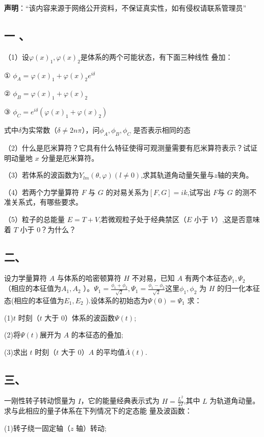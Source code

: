 
\textbf{声明}：“该内容来源于网络公开资料，不保证真实性，如有侵权请联系管理员”

\subsection{一 、}

（1）设$\varphi(x)_1, \varphi(x)_2$是体系的两个可能状态，有下面三种线性
叠加：

① $\phi_A = \varphi(x)_1 + \varphi(x)_2  e^{i\delta}$ 

② $\phi_B= \varphi(x)_1 + \varphi(x)_2 $

③ $\phi_C =e^{i\delta} (\varphi(x)_1 + \varphi(x)_2)$

式中$\delta$为实常数（$\delta \ne 2n\pi$），问$\phi_A ,\phi_B , \phi_C$ 是否表示相同的态

（2）什么是厄米算符？它具有什么特征使得可观测量需要有厄米算符表示？试证明动量地 $x$ 分量是厄米算符。

（3）若体系的波函数为$Y_{lm} (\theta, \varphi)(l\ne 0)$,求其轨道角动量矢量与$z$轴的夹角。

（4）若两个力学量算符 $F$ 与 $G$ 的对易关系为$[F,G]=ik$,试写出 $F$与 $G$ 的测不准关系式，有哪些要求。

（5）粒子的总能量 $E=T+V$,若微观粒子处于经典禁区（$E$ 小于 $V$）,这是否意味着 $T$ 小于 0？为什么？
\subsection{二、}
设力学量算符 $A$ 与体系的哈密顿算符 $H$ 不对易，已知 $A$ 有两个本征态$\Psi_1,\Psi_2 $ （相应的本征值为$A_1 , A_2$  ）。$\Psi_1=\frac{\phi_1+\phi_2}{\sqrt{2}},\Psi_1=\frac{\phi_1-\phi_2}{\sqrt{2}}$这里$\phi_1,\phi_2$ 为 $H$ 的归一化本征态(相应的本征值为$E_1 , E_2$ ).设体系的初始态为$\Psi(0)=\Psi_1$  求：

(1)$t$ 时刻（$t$ 大于 0）体系的波函数$\Psi(t)$;

(2)将$\Psi(t)$展开为 $A$ 的本征态的叠加;

(3)求出 $t$ 时刻（$t$ 大于 0）$A$ 的平均值$\overline A(t)$.
\subsection{三、}
一刚性转子转动惯量为 $I$，它的能量经典表示式为 $H=\frac{L^2}{2I}$,其中
$L$ 为轨道角动量。求与此相应的量子体系在下列情况下的定态能
量及波函数：

(1)转子绕一固定轴（$z$ 轴）转动;

